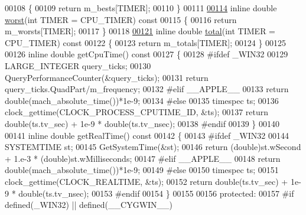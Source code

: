 \begin{DoxyCode}
00108 \textcolor{keyword}{  }\{
00109     \textcolor{keywordflow}{return} m\_bests[TIMER];
00110   \}
00111 
\hyperlink{class_eigen_1_1_bench_timer_ab912bf8bcae22898c85d907f0810173e}{00114}   \textcolor{keyword}{inline} \textcolor{keywordtype}{double} \hyperlink{class_eigen_1_1_bench_timer_ab912bf8bcae22898c85d907f0810173e}{worst}(\textcolor{keywordtype}{int} TIMER = CPU\_TIMER)\textcolor{keyword}{ const}
00115 \textcolor{keyword}{  }\{
00116     \textcolor{keywordflow}{return} m\_worsts[TIMER];
00117   \}
00118 
\hyperlink{class_eigen_1_1_bench_timer_af341aa613dba2d4a3d167093197e4e7a}{00121}   \textcolor{keyword}{inline} \textcolor{keywordtype}{double} \hyperlink{class_eigen_1_1_bench_timer_af341aa613dba2d4a3d167093197e4e7a}{total}(\textcolor{keywordtype}{int} TIMER = CPU\_TIMER)\textcolor{keyword}{ const}
00122 \textcolor{keyword}{  }\{
00123     \textcolor{keywordflow}{return} m\_totals[TIMER];
00124   \}
00125 
00126   \textcolor{keyword}{inline} \textcolor{keywordtype}{double} getCpuTime()\textcolor{keyword}{ const}
00127 \textcolor{keyword}{  }\{
00128 \textcolor{preprocessor}{#ifdef \_WIN32}
00129     LARGE\_INTEGER query\_ticks;
00130     QueryPerformanceCounter(&query\_ticks);
00131     \textcolor{keywordflow}{return} query\_ticks.QuadPart/m\_frequency;
00132 \textcolor{preprocessor}{#elif \_\_APPLE\_\_}
00133     \textcolor{keywordflow}{return} double(mach\_absolute\_time())*1e-9;
00134 \textcolor{preprocessor}{#else}
00135     timespec ts;
00136     clock\_gettime(CLOCK\_PROCESS\_CPUTIME\_ID, &ts);
00137     \textcolor{keywordflow}{return} double(ts.tv\_sec) + 1e-9 * double(ts.tv\_nsec);
00138 \textcolor{preprocessor}{#endif}
00139   \}
00140 
00141   \textcolor{keyword}{inline} \textcolor{keywordtype}{double} getRealTime()\textcolor{keyword}{ const}
00142 \textcolor{keyword}{  }\{
00143 \textcolor{preprocessor}{#ifdef \_WIN32}
00144     SYSTEMTIME st;
00145     GetSystemTime(&st);
00146     \textcolor{keywordflow}{return} (\textcolor{keywordtype}{double})st.wSecond + 1.e-3 * (double)st.wMilliseconds;
00147 #elif \_\_APPLE\_\_
00148     \textcolor{keywordflow}{return} \textcolor{keywordtype}{double}(mach\_absolute\_time())*1e-9;
00149 \textcolor{preprocessor}{#else}
00150     timespec ts;
00151     clock\_gettime(CLOCK\_REALTIME, &ts);
00152     \textcolor{keywordflow}{return} double(ts.tv\_sec) + 1e-9 * double(ts.tv\_nsec);
00153 \textcolor{preprocessor}{#endif}
00154   \}
00155 
00156 \textcolor{keyword}{protected}:
00157 \textcolor{preprocessor}{#if defined(\_WIN32) || defined(\_\_CYGWIN\_\_)}

\end{DoxyCode}

